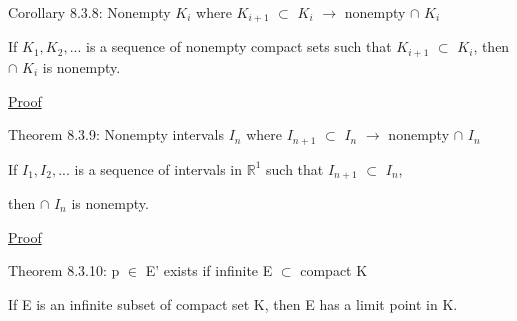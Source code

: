 	 \vspace{0.5cm}

{ \color{orange} Corollary 8.3.8: Nonempty $K_i$ where $K_{i+1}$ $\subset$ $K_i$
$\rightarrow$ nonempty $\cap$ $K_i$}

	\begin{adjustbox}{minipage=14cm, right, vspace=0.1cm 0cm}
		If $K_1, K_2, ...$ is a sequence of nonempty compact sets
		such that $K_{i+1}$ $\subset$ $K_i$, then $\cap$ $K_i$ is nonempty.
	\end{adjustbox}

{ \color{magenta} \underline{Proof} } 


	 \vspace{0.5cm}

{ \color{red} Theorem 8.3.9: Nonempty intervals $I_n$ where
$I_{n+1}$ $\subset$ $I_n$ $\rightarrow$ nonempty $\cap$ $I_n$}

	\begin{adjustbox}{minipage=14cm, right, vspace=0.1cm 0cm}
		If $I_1, I_2, ...$ is a sequence of intervals in $\mathbb{R}^1$
		such that $I_{n+1}$ $\subset$ $I_n$,
		
		then $\cap$ $I_n$ is nonempty.
	\end{adjustbox}

{ \color{magenta} \underline{Proof} }


	 \vspace{0.5cm}

{ \color{red} Theorem 8.3.10: p $\in$ E' exists if
infinite E $\subset$ compact K }

	\begin{adjustbox}{minipage=14cm, right, vspace=0.1cm 0cm}
		If E is an infinite subset of compact set K, then E has a
		limit point in K.
	\end{adjustbox}

